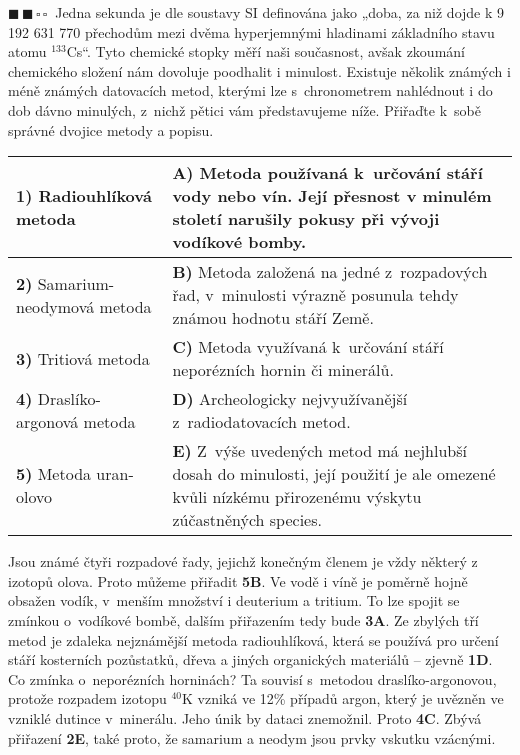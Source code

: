 \documentclass{book}
\newcommand{\dva}{$\blacksquare \, \blacksquare \, \square \, \square \; \; $}
\renewenvironment{quotation}{\par}{\par} %
\begin{document}
\hrulefill
\begin{quotation}
\dva Jedna sekunda je dle soustavy SI definována jako „doba, za niž dojde
k 9 192 631 770 přechodům mezi dvěma hyperjemnými hladinami základního
stavu atomu $^{133}$Cs“. Tyto chemické stopky měří naši současnost,
avšak zkoumání chemického složení nám dovoluje poodhalit i minulost.
Existuje několik známých i méně známých datovacích metod, kterými
lze s~chronometrem nahlédnout i do dob dávno minulých, z~nichž pětici
vám představujeme níže. Přiřaďte k~sobě správné dvojice metody a popisu. 
\begin{center}
\begin{tabular}{ m{6cm} | m{9cm} }
\textbf{1)} Radiouhlíková metoda & \textbf{A)} Metoda používaná k~určování stáří vody nebo vín. Její přesnost
v minulém století narušily pokusy při vývoji vodíkové bomby.  \\ \hline
\textbf{2)} Samarium-neodymová metoda & \textbf{B)} Metoda založená na jedné z~rozpadových řad, v~minulosti výrazně posunula tehdy známou hodnotu stáří Země. \\ \hline
\textbf{3)} Tritiová metoda & \textbf{C)} Metoda využívaná k~určování stáří neporézních hornin či minerálů. \\ \hline
\textbf{4)} Draslíko-argonová metoda & \textbf{D)} Archeologicky nejvyužívanější z~radiodatovacích metod. \\ \hline
\textbf{5)} Metoda uran-olovo & \textbf{E)} Z~výše uvedených metod má nejhlubší dosah do minulosti, její použití je ale omezené kvůli nízkému přirozenému výskytu zúčastněných species. 
\end{tabular}
\end{center}
\end{quotation} \dotfill \par 
Jsou známé čtyři rozpadové řady, jejichž konečným členem je vždy některý
z izotopů olova. Proto můžeme přiřadit \textbf{5B}. Ve vodě i víně je poměrně
hojně obsažen vodík, v~menším množství i deuterium a tritium. To lze
spojit se zmínkou o~vodíkové bombě, dalším přiřazením tedy bude \textbf{3A}.
Ze zbylých tří metod je zdaleka nejznámější metoda radiouhlíková,
která se používá pro určení stáří kosterních pozůstatků, dřeva a jiných
organických materiálů -- zjevně \textbf{1D}. Co zmínka o~neporézních horninách?
Ta souvisí s~metodou draslíko-argonovou, protože rozpadem izotopu
$^{40}$K vzniká ve 12\% případů argon, který je uvězněn ve vzniklé
dutince v~minerálu. Jeho únik by dataci znemožnil. Proto \textbf{4C}. Zbývá
přiřazení \textbf{2E}, také proto, že samarium a neodym jsou prvky vskutku
vzácnými. 
\end{document}

